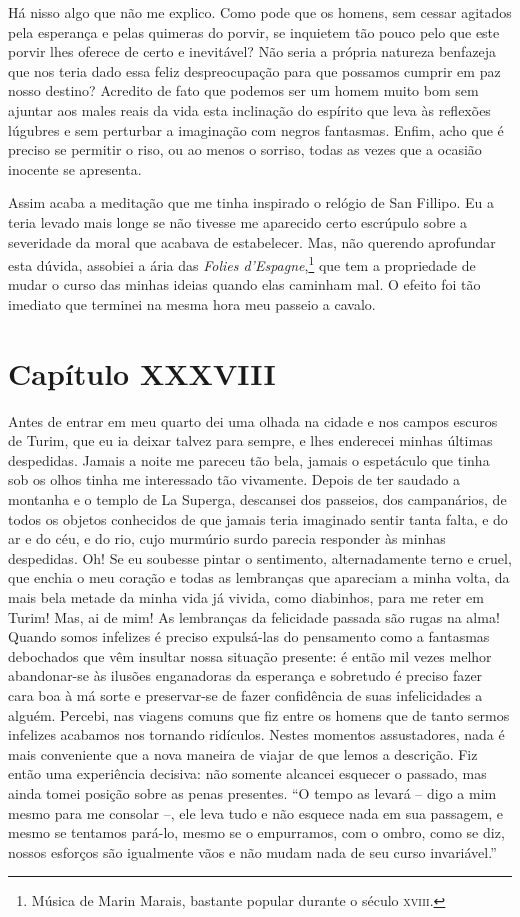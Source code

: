 Há nisso algo que não me explico. Como pode que os homens, sem cessar
agitados pela esperança e pelas quimeras do porvir, se inquietem tão                   
pouco pelo que este porvir lhes oferece de certo e inevitável? Não
seria a própria natureza benfazeja que nos teria dado essa feliz
despreocupação para que possamos cumprir em paz nosso destino? Acredito
de fato que podemos ser um homem muito bom sem ajuntar aos males reais
da vida esta inclinação do espírito que leva às reflexões lúgubres e
sem perturbar a imaginação com negros fantasmas. Enfim, acho que é
preciso se permitir o riso, ou ao menos o sorriso, todas as vezes que a
ocasião inocente se apresenta.

Assim acaba a meditação que me tinha inspirado o relógio de San Fillipo.
Eu a teria levado mais longe se não tivesse me aparecido certo
escrúpulo sobre a severidade da moral que acabava de estabelecer. Mas,
não querendo aprofundar esta dúvida, assobiei a ária das \textit{Folies
d’Espagne},\footnote{ Música de Marin Marais, bastante
popular durante o século \textsc{xviii}.} que tem a propriedade de mudar o
curso das minhas ideias quando elas caminham mal. O efeito foi tão
imediato que terminei na mesma hora meu passeio a cavalo.

\section{Capítulo XXXVIII}

 Antes de entrar em meu quarto dei uma olhada na cidade e nos campos
escuros de Turim, que eu ia deixar talvez para sempre, e lhes enderecei
minhas últimas despedidas. Jamais a noite me pareceu tão bela, jamais o
espetáculo que tinha sob os olhos tinha me interessado tão vivamente.
Depois de ter saudado a montanha e o templo de La Superga, descansei
dos passeios, dos campanários, de todos os objetos conhecidos de que
jamais teria imaginado sentir tanta falta, e do ar e do céu, e do rio,
cujo murmúrio surdo parecia responder às minhas despedidas. Oh! Se eu
soubesse pintar o sentimento, alternadamente terno e cruel, que enchia
o meu coração e todas as lembranças que apareciam a minha volta, da
mais bela metade da minha vida já vivida, como diabinhos, para me reter
em Turim! Mas, ai de mim! As lembranças da felicidade passada são rugas
na alma! Quando somos infelizes é preciso expulsá-las do pensamento
como a fantasmas debochados que vêm insultar nossa situação presente: é
então mil vezes melhor abandonar-se às ilusões enganadoras da esperança
e sobretudo é preciso fazer cara boa à má sorte e preservar-se de fazer
confidência de suas infelicidades a alguém. Percebi, nas viagens comuns
que fiz entre os homens que de tanto sermos infelizes acabamos nos
tornando ridículos. Nestes momentos assustadores, nada é mais
conveniente que a nova maneira de viajar de que lemos a descrição. Fiz
então uma experiência decisiva: não somente alcancei esquecer o
passado, mas ainda tomei posição sobre as penas presentes. ``O tempo as
levará -- digo a mim mesmo para me consolar --, ele leva tudo e não esquece nada
em sua passagem, e mesmo se tentamos pará-lo, mesmo se o empurramos,
com o ombro, como se diz, nossos esforços são igualmente vãos e não
mudam nada de seu curso invariável.''


